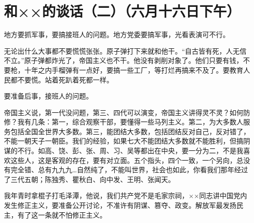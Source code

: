 \section[和××的谈话（二）（六月十六日下午）]{和××的谈话（二）（六月十六日下午）}


地方要抓军事，要搞接班人的问题。地方党委要搞军事，光看表演可不行。

无论出什么大事都不要慌慌张张。原子弹打下来就和他干。“自古皆有死，人无信不立。”原子弹都炸光了，帝国主义也不干。他没有剥削对象了。他们只要有钱，不要枪，十年之内手榴弹有一点好，要搞一些工厂，等打烂再搞来不及了。要教育人民都不要慌。站着死趴着死都一样。

要准备后事，接班人的问题。

帝国主义说，第一代没问题，第三、四代可以演变，帝国主义讲得灵不灵？如何防修？我有几条：第一，综合观察干部，要懂得一些马列主义。第二，为大多数人服务包括全国全世界大多数。第三，能团结大多数，包括团结反对自己，反对错了，不能一朝天子一朝臣。我们的经验，如果七大不能团结大多数就不能胜利，但搞阴谋的不行。如高、饶、彭、张、周、习、吴等都出在中央，要一分为二，不是我喜欢这些人，这是客观的存在，要有对立面。五个指头，四个一致，一个另向，总没有完全错、总有九九九…自然纯了，不能叫世界，社会也如此，你看我们那年经过了三代五朝；陈独秀、瞿秋白、向中发、王明、张闻天。

我年青时拿棍子打毛泽潭，他说，我们共产党不是毛家宗祠，××同志讲中国党内发生修正主义，要准备公开讨论，不准许有阴谋、篡夺、政变。解放军最发扬民主，有了这一条就不怕修正主义。


